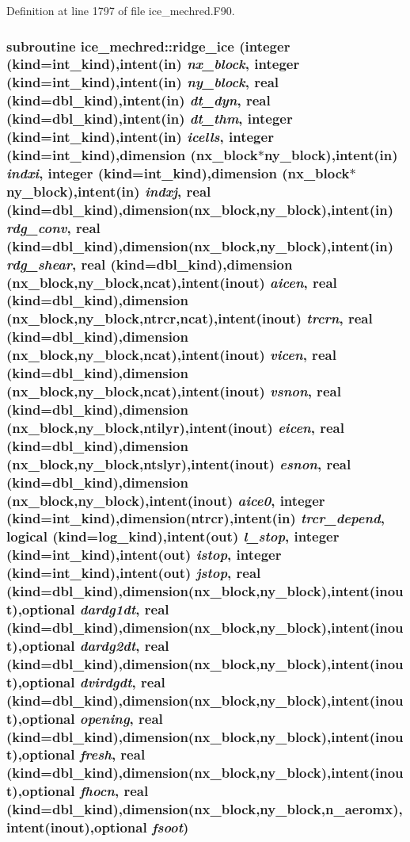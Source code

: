 Definition at line 1797 of file ice\_\-mechred.F90.\hypertarget{namespaceice__mechred_a22ae992e7f20fe021992af92a29f81e1}{
\subsubsection[{ridge\_\-ice}]{\setlength{\rightskip}{0pt plus 5cm}subroutine ice\_\-mechred::ridge\_\-ice (integer (kind=int\_\-kind),intent(in) {\em nx\_\-block}, \/  integer (kind=int\_\-kind),intent(in) {\em ny\_\-block}, \/  real (kind=dbl\_\-kind),intent(in) {\em dt\_\-dyn}, \/  real (kind=dbl\_\-kind),intent(in) {\em dt\_\-thm}, \/  integer (kind=int\_\-kind),intent(in) {\em icells}, \/  integer (kind=int\_\-kind),dimension (nx\_\-block$\ast$ny\_\-block),intent(in) {\em indxi}, \/  integer (kind=int\_\-kind),dimension (nx\_\-block$\ast$ny\_\-block),intent(in) {\em indxj}, \/  real (kind=dbl\_\-kind),dimension(nx\_\-block,ny\_\-block),intent(in) {\em rdg\_\-conv}, \/  real (kind=dbl\_\-kind),dimension(nx\_\-block,ny\_\-block),intent(in) {\em rdg\_\-shear}, \/  real (kind=dbl\_\-kind),dimension (nx\_\-block,ny\_\-block,ncat),intent(inout) {\em aicen}, \/  real (kind=dbl\_\-kind),dimension (nx\_\-block,ny\_\-block,ntrcr,ncat),intent(inout) {\em trcrn}, \/  real (kind=dbl\_\-kind),dimension (nx\_\-block,ny\_\-block,ncat),intent(inout) {\em vicen}, \/  real (kind=dbl\_\-kind),dimension (nx\_\-block,ny\_\-block,ncat),intent(inout) {\em vsnon}, \/  real (kind=dbl\_\-kind),dimension (nx\_\-block,ny\_\-block,ntilyr),intent(inout) {\em eicen}, \/  real (kind=dbl\_\-kind),dimension (nx\_\-block,ny\_\-block,ntslyr),intent(inout) {\em esnon}, \/  real (kind=dbl\_\-kind),dimension (nx\_\-block,ny\_\-block),intent(inout) {\em aice0}, \/  integer (kind=int\_\-kind),dimension(ntrcr),intent(in) {\em trcr\_\-depend}, \/  logical (kind=log\_\-kind),intent(out) {\em l\_\-stop}, \/  integer (kind=int\_\-kind),intent(out) {\em istop}, \/  integer (kind=int\_\-kind),intent(out) {\em jstop}, \/  real (kind=dbl\_\-kind),dimension(nx\_\-block,ny\_\-block),intent(inout),optional {\em dardg1dt}, \/  real (kind=dbl\_\-kind),dimension(nx\_\-block,ny\_\-block),intent(inout),optional {\em dardg2dt}, \/  real (kind=dbl\_\-kind),dimension(nx\_\-block,ny\_\-block),intent(inout),optional {\em dvirdgdt}, \/  real (kind=dbl\_\-kind),dimension(nx\_\-block,ny\_\-block),intent(inout),optional {\em opening}, \/  real (kind=dbl\_\-kind),dimension(nx\_\-block,ny\_\-block),intent(inout),optional {\em fresh}, \/  real (kind=dbl\_\-kind),dimension(nx\_\-block,ny\_\-block),intent(inout),optional {\em fhocn}, \/  real (kind=dbl\_\-kind),dimension(nx\_\-block,ny\_\-block,n\_\-aeromx),intent(inout),optional {\em fsoot})}}
\label{namespaceice__mechred_a22ae992e7f20fe021992af92a29f81e1}


